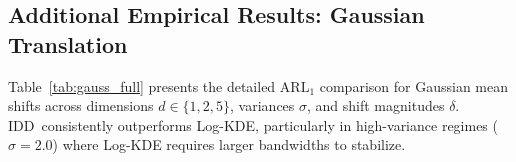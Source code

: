 \documentclass{article}
\newcommand{\algoname}{\textsc{IDD}\xspace}
\theoremstyle{plain}
\theoremstyle{definition}
\theoremstyle{remark}
\begin{document}

\subsection{Additional Empirical Results: Gaussian Translation}
Table~\ref{tab:gauss_full} presents the detailed $\mathrm{ARL}_1$ comparison for Gaussian mean shifts across dimensions $d \in \{1, 2, 5\}$, variances $\sigma$, and shift magnitudes $\delta$. \algoname\ consistently outperforms Log-KDE, particularly in high-variance regimes ($\sigma=2.0$) where Log-KDE requires larger bandwidths to stabilize.
\end{document}
